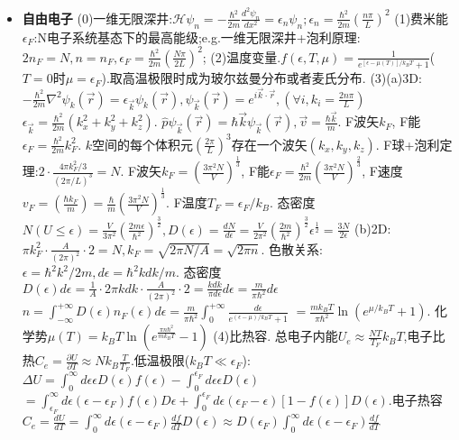 \documentclass[UTF8,a4paper,1pt,twocolumn]{ctexart}
\begin{document}
\begin{itemize}
  \item \textbf{自由电子}
  (0)一维无限深井:$\mathcal{H}\psi_{n}=-\frac{\hbar^2}{2m}\frac{d^2\psi_{n}}{dx^2}=\epsilon_{n}\psi_{n};\epsilon_{n}=\frac{\hbar^2}{2m}(\frac{n\pi}{L})^2$
  (1)费米能$\epsilon_{F}$:N电子系统基态下的最高能级;e.g.一维无限深井+泡利原理:$2n_F=N,n=n_F,\epsilon_F=\frac{\hbar^2}{2m}(\frac{N\pi}{2L})^2$;
  (2)温度变量.$f(\epsilon,T,\mu)=\frac{1}{e^{[\epsilon-\mu(T)]/k_{B}T}+1}$($T=0$时$\mu=\epsilon_F$).取高温极限时成为玻尔兹曼分布或者麦氏分布.
  (3)(a)3D:$-\frac{\hbar^2}{2m}\nabla^2\psi_{k}(\vec{r})=\epsilon_{\vec{k}}\psi_{k}(\vec{r}),\psi_{\vec{k}}(\vec{r})=e^{i\vec{k}\cdot\vec{r}},(\forall i,k_i=\frac{2n\pi}{L})$
  $\epsilon_{\vec{k}}=\frac{\hbar^2}{2m}(k_x^2+k_y^2+k_z^2)$.
  $\hat{p}\psi_{\vec{k}}(\vec{r})=\hbar\vec{k}\psi_{\vec{k}}(\vec{r}),\vec{v}=\frac{\hbar\vec{k}}{m}$.
  F波矢$k_F$,
  F能$\epsilon_F=\frac{\hbar^2}{2m}k_{F}^2$.
  $k$空间的每个体积元$(\frac{2\pi}{L})^3$存在一个波矢$(k_x,k_y,k_z)$.
  F球+泡利定理:$2\cdot\frac{4\pi k_F^2/3}{(2\pi/L)^3}=N$.
  F波矢$k_F=(\frac{3\pi^2N}{V})^{\frac{1}{3}}$,
  F能$\epsilon_{F}=\frac{\hbar^2}{2m}(\frac{3\pi^2N}{V})^{\frac{2}{3}}$,
  F速度$v_F=(\frac{\hbar k_F}{m})=\frac{\hbar}{m}(\frac{3\pi^2N}{V})^{\frac{1}{3}}$.
  F温度$T_F=\epsilon_F/k_B$.
  态密度$N(U\leq\epsilon)=\frac{V}{3\pi^2}(\frac{2m\epsilon}{\hbar^2})^{\frac{3}{2}},D(\epsilon)=\frac{dN}{d\epsilon}=\frac{V}{2\pi^2}(\frac{2m}{\hbar^2})^{\frac{3}{2}}\epsilon^{\frac{1}{2}}=\frac{3N}{2\epsilon}$
  (b)2D:
  $\pi k_F^2\cdot\frac{A}{(2\pi)^2}\cdot 2=N,k_F=\sqrt{2\pi N/A}=\sqrt{2\pi n}$.
  色散关系:$\epsilon=\hbar^2 k^2/2m,d\epsilon=\hbar^2kdk/m.$
  态密度$D(\epsilon)d\epsilon=\frac{1}{A}\cdot2\pi kdk\cdot\frac{A}{(2\pi)^2}\cdot 2=\frac{kdk}{\pi d\epsilon}d\epsilon=\frac{m}{\pi\hbar^2}d\epsilon$
  $n=\int_{-\infty}^{+\infty}D(\epsilon)n_F(\epsilon)d\epsilon=\frac{m}{\pi\hbar^2}\int_{0}^{+\infty}\frac{d\epsilon}{e^{(\epsilon-\mu)/k_BT}+1}$
  $=\frac{mk_BT}{\pi\hbar^2}\ln{(e^{\mu/k_BT}+1)}$.
  化学势$\mu(T)=k_BT\ln(e^{\frac{\pi n \hbar^2}{mk_BT}}-1)$
  (4)比热容.
  总电子内能$U_{e}\approx\frac{NT}{T_F}k_B T$,电子比热$C_{e}=\frac{\partial U}{\partial T}\approx Nk_B \frac{T}{T_F}$.低温极限($k_B T\ll \epsilon_F$):$\Delta U=\int_0^{\infty}d\epsilon\epsilon D(\epsilon)f(\epsilon)-\int_0^{\epsilon_F}d\epsilon\epsilon D(\epsilon)$
  $=\int_{\epsilon_F}^{\infty}d\epsilon(\epsilon-\epsilon_F)f(\epsilon)D\epsilon + \int_0^{\epsilon_F}d\epsilon(\epsilon_F-\epsilon)[1-f(\epsilon)]D(\epsilon)$.电子热容$C_e=\frac{dU}{dT}=\int_{0}^{\infty}d\epsilon(\epsilon-\epsilon_F)\frac{df}{dT}D(\epsilon)\approx D(\epsilon_F)\int_0^{\infty}d\epsilon(\epsilon-\epsilon_F)\frac{df}{dT}$

\end{itemize}
\end{document}
